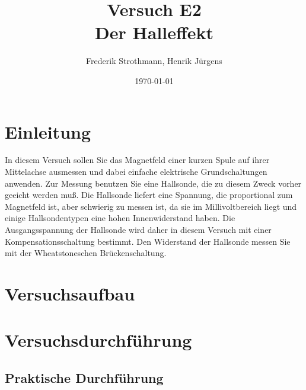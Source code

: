 \documentclass[12pt]{scrartcl}
\title{Versuch E2\\ Der Halleffekt}
\author{Frederik Strothmann, Henrik Jürgens}
\date{\today}
\begin{document}

\maketitle
\tableofcontents
\newpage


\section{Einleitung}

In diesem Versuch sollen Sie das Magnetfeld einer kurzen Spule auf ihrer Mittelachse ausmessen und dabei einfache elektrische Grundschaltungen anwenden. Zur Messung benutzen Sie eine Hallsonde, die zu diesem Zweck vorher geeicht werden muß. Die Hallsonde liefert eine Spannung, die proportional zum Magnetfeld ist, aber schwierig zu messen ist,
da sie im Millivoltbereich liegt und einige Hallsondentypen eine hohen Innenwiderstand
haben. Die Ausgangsspannung der Hallsonde wird daher in diesem Versuch mit einer
Kompensationsschaltung bestimmt. Den Widerstand der Hallsonde messen Sie mit der
Wheatstoneschen Brückenschaltung.


\section{Versuchsaufbau}


\section{Versuchsdurchführung}


\subsection{Praktische Durchführung}
\end{document}
